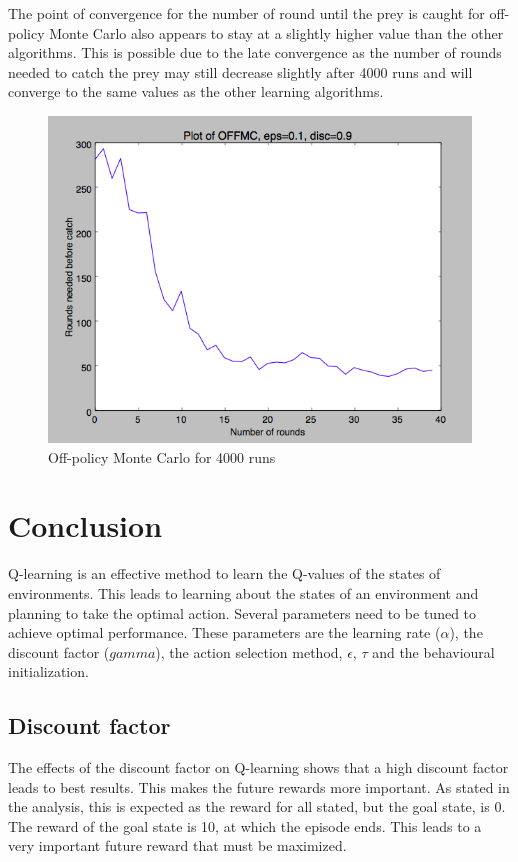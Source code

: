 \documentclass{article}
\begin{document}
The point of convergence for the number of round until the prey is caught for off-policy Monte Carlo also appears to stay at a slightly higher value than the other algorithms. This is possible due to the late convergence as the number of rounds needed to catch the prey may  still decrease slightly after 4000 runs and will converge to the same values as the other learning algorithms.

\begin{figure}[H]
\begin{center}
\includegraphics[scale=0.4]{OFFMC_11x11_preyat_5x5}
\caption{Off-policy Monte Carlo for 4000 runs}
\label{fig:offmc}
\end{center}
\end{figure}

\pagebreak
\section{Conclusion}
Q-learning is an effective method to learn the Q-values of the states of environments. This leads to learning about the states of an environment and planning to take the optimal action. Several parameters need to be tuned to achieve optimal performance. These parameters are the learning rate  ($\alpha$), the discount factor ($gamma$), the action selection method, $\epsilon$, $\tau$ and the behavioural initialization. 

\subsection{Discount factor}
The effects of the discount factor on Q-learning shows that a high discount factor leads to best results. This makes the future rewards more important. As stated in the analysis, this is expected as the reward for all stated, but the goal state, is 0. The reward of the goal state is 10, at which the episode ends. This leads to a very important future reward that must be maximized.
\end{document}
